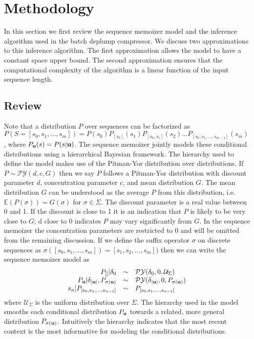 \section{Methodology}
\label{section:methodology}
\newcommand{\PY}{\ensuremath{\mathcal{P}\mathcal{Y}}}

In this section we first review the sequence memoizer model and the inference algorithm used in the batch deplump compressor. We discuss two approximations to this inference algorithm.  The first approximation allows the model to have a constant space upper bound.  The second approximation ensures that the computational complexity of the algorithm is a linear function of the input sequence length.

\subsection{Review}

Note that a distribution $P$ over sequences can be factorized as $P(S = [s_0, s_1, \ldots, s_m]) = P(s_0)P_{[s_0]}(s_1)P_{[s_0,s_1]}(s_2) \ldots P_{[s_0,s_1,\ldots,s_{m-1}]}(s_m)$, where $P_{\bf u}(s) = P(s | {\bf u})$.  The sequence memoizer \citep{Wood2009} jointly models these conditional distributions using a hierarchical Bayesian framework.  The hierarchy used to define the model makes use of the Pitman-Yor \citep{Pitman1997} distribution over distributions. If $P \sim \PY(d,c,G)$ then we say $P$ follows a Pitman-Yor distribution with discount parameter $d$, concentration parameter $c$, and mean distribution $G$.  The mean distribution $G$ can be understood as the average $P$ from this distribution, i.e. $\mathbb{E}(P(\sigma)) = G(\sigma)$ for $\sigma \in \Sigma$.  The discount parameter is a real value between 0 and 1.  If the discount is close to 1 it is an indication that $P$ is likely to be very close to $G$; d close to 0 indicates $P$ may vary significantly from $G$.  In the sequence memoizer the concentration parameters are restricted to 0 and will be omitted from the remaining discussion. If we define the suffix operator $\sigma$ on discrete sequences as $\sigma([s_0, s_1, \ldots, s_m]) = [s_1,s_2, \ldots, s_m])$ then we can write the sequence memoizer model as 
%
\[
\begin{array}{rcl}
	P_{[ ]} 	|	\delta_0 					& \sim & \PY(\delta_0,0,\mathcal{U}_{\Sigma})\\
	P_{\bf u} 	| 	\delta_{|{\bf u}|}, P_{\sigma({\bf u})} 	& \sim & \PY(\delta_{|{\bf u}|}, 0, P_{\sigma({\bf u})}) \\
	s_n 		|  	P_{[s_0, s_1, \ldots, s_{n-1}] }	& \sim & P_{[s_0, s_1, \ldots, s_{n-1}] }
\end{array}
\]
%
\noindent where $\mathcal{U}_{\Sigma}$ is the uniform distribution over $\Sigma$.  The hierarchy used in the model smooths each conditional distribution $P_{\bf u}$ towards a related, more general distribution $P_{\sigma({\bf u})}$.  Intuitively the hierarchy indicates that the most recent context is the most informative for modeling the conditional distributions.

